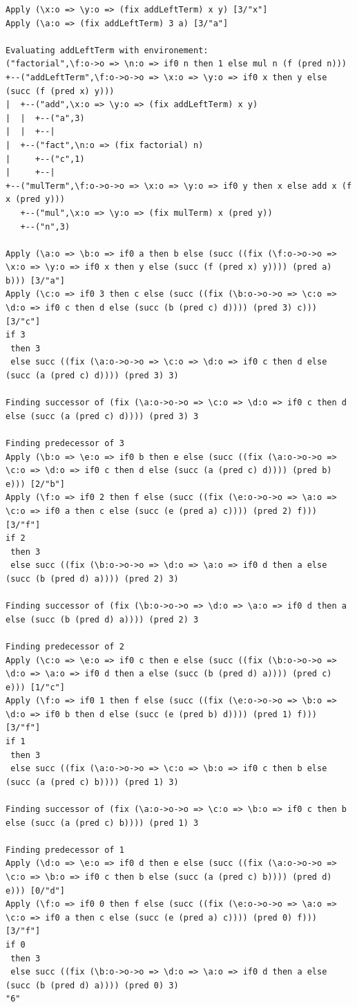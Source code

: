\documentclass[12pt,a4paper]{report}
\theoremstyle{definition}
\theoremstyle{definition}
\theoremstyle{remark}
\begin{document}
\begin{verbatim}
Apply (\x:o => \y:o => (fix addLeftTerm) x y) [3/"x"] 
Apply (\a:o => (fix addLeftTerm) 3 a) [3/"a"] 

Evaluating addLeftTerm with environement:
("factorial",\f:o->o => \n:o => if0 n then 1 else mul n (f (pred n)))
+--("addLeftTerm",\f:o->o->o => \x:o => \y:o => if0 x then y else (succ (f (pred x) y)))
|  +--("add",\x:o => \y:o => (fix addLeftTerm) x y)
|  |  +--("a",3)
|  |  +--|
|  +--("fact",\n:o => (fix factorial) n)
|     +--("c",1)
|     +--|
+--("mulTerm",\f:o->o->o => \x:o => \y:o => if0 y then x else add x (f x (pred y)))
   +--("mul",\x:o => \y:o => (fix mulTerm) x (pred y))
   +--("n",3)

Apply (\a:o => \b:o => if0 a then b else (succ ((fix (\f:o->o->o => \x:o => \y:o => if0 x then y else (succ (f (pred x) y)))) (pred a) b))) [3/"a"] 
Apply (\c:o => if0 3 then c else (succ ((fix (\b:o->o->o => \c:o => \d:o => if0 c then d else (succ (b (pred c) d)))) (pred 3) c))) [3/"c"] 
if 3
 then 3
 else succ ((fix (\a:o->o->o => \c:o => \d:o => if0 c then d else (succ (a (pred c) d)))) (pred 3) 3)

Finding successor of (fix (\a:o->o->o => \c:o => \d:o => if0 c then d else (succ (a (pred c) d)))) (pred 3) 3

Finding predecessor of 3
Apply (\b:o => \e:o => if0 b then e else (succ ((fix (\a:o->o->o => \c:o => \d:o => if0 c then d else (succ (a (pred c) d)))) (pred b) e))) [2/"b"] 
Apply (\f:o => if0 2 then f else (succ ((fix (\e:o->o->o => \a:o => \c:o => if0 a then c else (succ (e (pred a) c)))) (pred 2) f))) [3/"f"] 
if 2
 then 3
 else succ ((fix (\b:o->o->o => \d:o => \a:o => if0 d then a else (succ (b (pred d) a)))) (pred 2) 3)

Finding successor of (fix (\b:o->o->o => \d:o => \a:o => if0 d then a else (succ (b (pred d) a)))) (pred 2) 3

Finding predecessor of 2
Apply (\c:o => \e:o => if0 c then e else (succ ((fix (\b:o->o->o => \d:o => \a:o => if0 d then a else (succ (b (pred d) a)))) (pred c) e))) [1/"c"] 
Apply (\f:o => if0 1 then f else (succ ((fix (\e:o->o->o => \b:o => \d:o => if0 b then d else (succ (e (pred b) d)))) (pred 1) f))) [3/"f"] 
if 1
 then 3
 else succ ((fix (\a:o->o->o => \c:o => \b:o => if0 c then b else (succ (a (pred c) b)))) (pred 1) 3)

Finding successor of (fix (\a:o->o->o => \c:o => \b:o => if0 c then b else (succ (a (pred c) b)))) (pred 1) 3

Finding predecessor of 1
Apply (\d:o => \e:o => if0 d then e else (succ ((fix (\a:o->o->o => \c:o => \b:o => if0 c then b else (succ (a (pred c) b)))) (pred d) e))) [0/"d"] 
Apply (\f:o => if0 0 then f else (succ ((fix (\e:o->o->o => \a:o => \c:o => if0 a then c else (succ (e (pred a) c)))) (pred 0) f))) [3/"f"] 
if 0
 then 3
 else succ ((fix (\b:o->o->o => \d:o => \a:o => if0 d then a else (succ (b (pred d) a)))) (pred 0) 3)
"6"
\end{verbatim}
\end{document}
